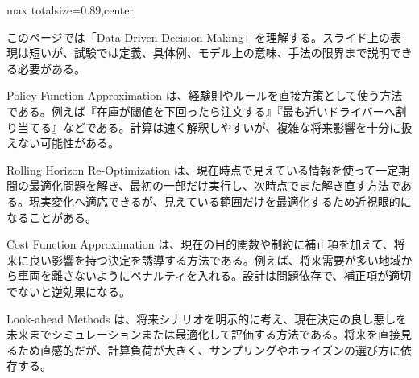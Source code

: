 \begin{minipage}[t]{0.58\textwidth}
\begin{adjustbox}{max totalsize={\textwidth}{0.89\textheight},center}
\begin{minipage}{\textwidth}\scriptsize
{}このページでは「Data Driven Decision Making」を理解する。スライド上の表現は短いが、試験では定義、具体例、モデル上の意味、手法の限界まで説明できる必要がある。\par
Policy Function Approximation は、経験則やルールを直接方策として使う方法である。例えば『在庫が閾値を下回ったら注文する』『最も近いドライバーへ割り当てる』などである。計算は速く解釈しやすいが、複雑な将来影響を十分に扱えない可能性がある。\par
Rolling Horizon Re-Optimization は、現在時点で見えている情報を使って一定期間の最適化問題を解き、最初の一部だけ実行し、次時点でまた解き直す方法である。現実変化へ適応できるが、見えている範囲だけを最適化するため近視眼的になることがある。\par
Cost Function Approximation は、現在の目的関数や制約に補正項を加えて、将来に良い影響を持つ決定を誘導する方法である。例えば、将来需要が多い地域から車両を離さないようにペナルティを入れる。設計は問題依存で、補正項が適切でないと逆効果になる。\par
Look-ahead Methods は、将来シナリオを明示的に考え、現在決定の良し悪しを未来までシミュレーションまたは最適化して評価する方法である。将来を直接見るため直感的だが、計算負荷が大きく、サンプリングやホライズンの選び方に依存する。\par

\end{minipage}
\end{adjustbox}
\end{minipage}
